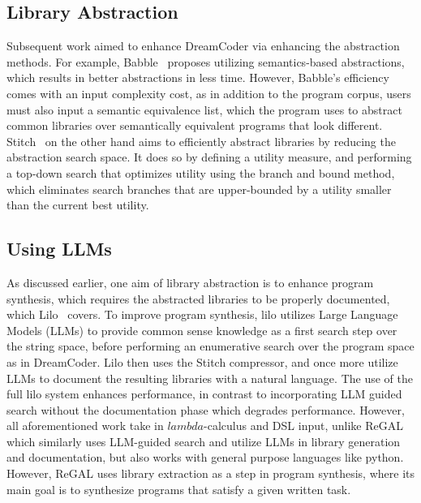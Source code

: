 \subsection{Library Abstraction}
Subsequent work aimed to enhance DreamCoder via enhancing the abstraction methods. For example, Babble~\cite{Cao_2023babble} proposes utilizing semantics-based abstractions, which results in better abstractions in less time. However, Babble's efficiency comes with an input complexity cost, as in addition to the program corpus, users must also input a semantic equivalence list, which the program uses to abstract common libraries over semantically equivalent programs that look different. Stitch~\cite{Bowers_2023stitch} on the other hand aims to efficiently abstract libraries by reducing the abstraction search space. It does so by defining a utility measure, and performing a top-down search that optimizes utility using the branch and bound method, which eliminates search branches that are upper-bounded by a utility smaller than the current best utility. 

\subsection{Using LLMs}
As discussed earlier, one aim of library abstraction is to enhance program synthesis, which requires the abstracted libraries to be properly documented, which Lilo~\cite{grand2024lilo} covers. To improve program synthesis, lilo utilizes Large Language Models (LLMs) to provide common sense knowledge as a first search step over the string space, before performing an enumerative search over the program space as in DreamCoder. Lilo then uses the Stitch compressor, and once more utilize LLMs to document the resulting libraries with a natural language. The use of the full lilo system enhances performance, in contrast to incorporating LLM guided search without the documentation phase which degrades performance. However, all aforementioned work take in \(lambda\)-calculus and DSL input, unlike ReGAL~\cite{stengeleskin2024regal} which similarly uses LLM-guided search and utilize LLMs in library generation and documentation, but also works with general purpose languages like python. However, ReGAL uses library extraction as a step in program synthesis, where its main goal is to synthesize programs that satisfy a given written task. 

